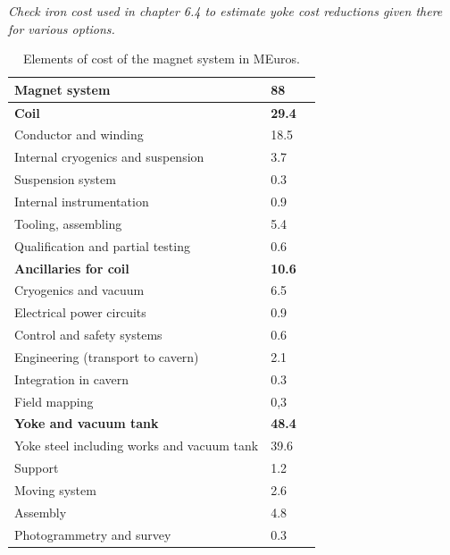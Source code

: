 \textit{Check iron cost used in chapter 6.4 to estimate yoke cost reductions given there for various options.}

\begin{table}\hspace*{-0cm}\small 
\begin{tabular}[h!]{ l p{0.2\hsize}  p{0.1\hsize} }
\toprule
\textbf{Magnet system} & \textbf{88}\\
\midrule
\textbf{Coil} & \textbf{29.4}\\
\midrule
Conductor and winding & 18.5\\
Internal cryogenics and suspension &  3.7\\
Suspension system & 0.3 \\
Internal instrumentation & 0.9 \\
Tooling, assembling & 5.4 \\
Qualification and partial testing & 0.6\\
\midrule
\textbf{Ancillaries for coil} & \textbf{10.6}\\
\midrule
Cryogenics and vacuum & 6.5\\
Electrical power circuits & 0.9\\
Control and safety systems& 0.6 \\
Engineering (transport to cavern) & 2.1\\
Integration in cavern& 0.3 \\
Field mapping&0,3\\
\midrule
\textbf{Yoke and vacuum tank} & \textbf{48.4}\\
\midrule
Yoke steel including works and vacuum tank& 39.6\\
Support &1.2\\
Moving system& 2.6\\
Assembly& 4.8\\
Photogrammetry and survey& 0.3 \\
\bottomrule
\end{tabular}
\caption{\label{magnet_cost}Elements of cost of the magnet system in MEuros.}
\end{table}



